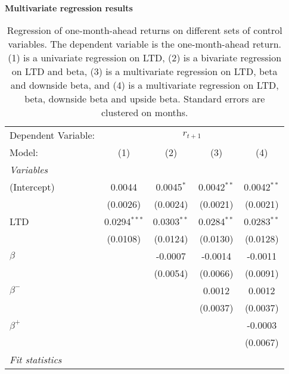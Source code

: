 \begin{table}[H]
\caption{\\ \large{\textbf{Multivariate regression results}}}
\captionsetup{justification = justified, width = \linewidth}
\caption*{Regression of one-month-ahead returns on different
                               sets of control variables. The dependent variable is
                               the one-month-ahead return. (1) is a univariate regression
                               on LTD, (2) is a bivariate regression on LTD and beta,
                               (3) is a multivariate regression on LTD, beta and downside 
                               beta, and (4) is a multivariate regression on LTD, beta,
                               downside beta and upside beta. Standard errors are clustered
                               on months.}
   \centering
\label{reg_clustered_on_time_1_size_bm}
   \begin{tabular}{lcccc}
      \tabularnewline \midrule \midrule
      Dependent Variable: & \multicolumn{4}{c}{$r_{t+1}$}\\
      Model:         & (1)            & (2)           & (3)           & (4)\\  
      \midrule
      \emph{Variables}\\
      (Intercept)    & 0.0044         & 0.0045$^{*}$  & 0.0042$^{**}$ & 0.0042$^{**}$\\   
                     & (0.0026)       & (0.0024)      & (0.0021)      & (0.0021)\\   
      LTD            & 0.0294$^{***}$ & 0.0303$^{**}$ & 0.0284$^{**}$ & 0.0283$^{**}$\\   
                     & (0.0108)       & (0.0124)      & (0.0130)      & (0.0128)\\   
      $\beta$        &                & -0.0007       & -0.0014       & -0.0011\\   
                     &                & (0.0054)      & (0.0066)      & (0.0091)\\   
      $\beta^{-}$    &                &               & 0.0012        & 0.0012\\   
                     &                &               & (0.0037)      & (0.0037)\\   
      $\beta^{+}$    &                &               &               & -0.0003\\   
                     &                &               &               & (0.0067)\\   
      \midrule
      \emph{Fit statistics}\\

\end{tabular}
\end{table}
